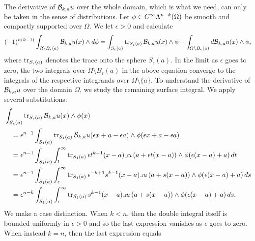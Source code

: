\documentclass[10pt,a4paper]{article}
\begin{document}
The derivative of ${\mathcal B}_{k,a} u$ over the whole domain, which is what we need, can only be taken in the sense of distributions. 
Let $\phi \in C^{\infty}\Lambda^{n-k}(\Omega)$ be smooth and compactly supported over $\Omega$. 
We let $\epsilon > 0$ and calculate 
\begin{align*}
    (-1)^{n(k-1)} %
    \int_{ \Omega \setminus B_\epsilon(a) }
    \Bogov_{\mia,a} u(x) \wedge \cartan \phi 
    =
    \int_{ S_\epsilon(a) }
    \trace_{S_\epsilon(a)}{ \Bogov_{\mia,a} u(x) \wedge \phi } 
    -
    \int_{ \Omega \setminus B_\epsilon(a) }
    \cartan \Bogov_{\mia,a} u(x) \wedge \phi 
    ,
\end{align*}
where $\operatorname{tr}_{S_{\epsilon}(a)}$ denotes the trace onto the sphere $S_{\epsilon}(a)$. 
In the limit as $\epsilon$ goes to zero, the two integrals over $\Omega \setminus B_\epsilon(a)$ in the above equation converge to the integrals of the respective integrands over $\Omega \setminus \{a\}$. 
To understand the derivative of ${\mathcal B}_{k,a} u$ over the domain $\Omega$, 
we study the remaining surface integral. 
We apply several substitutions:
\begin{align*}
    &\int_{ S_\epsilon(a) }
    \operatorname{tr}_{S_\epsilon(a)}{ {\mathcal B}_{k,a} u(x) \wedge \phi(x) } 
    \\&\quad 
    =
    \epsilon^{n-1}
    \int_{ S_1(a) }
    \operatorname{tr}_{S_1(a)}{ {\mathcal B}_{k,a} u( \epsilon x + a - \epsilon a ) \wedge \phi( \epsilon x + a - \epsilon a ) }
    \\&\quad 
    =
    \epsilon^{n-1}
    \int_{ S_1(a) }
    \int_{1}^\infty 
    \operatorname{tr}_{S_1(a)}{ 
        \epsilon t^{k-1} (x-a)\lrcorner u\left( a + \epsilon t( x - a )\right) 
        \wedge \phi( \epsilon (x-a) + a ) 
    }
    \,dt 
    \\&\quad 
    =
    \epsilon^{n-1}
    \int_{ S_1(a) }
    \int_{\epsilon}^\infty 
    \operatorname{tr}_{S_1(a)}{ 
        \epsilon^{-k+1} s^{k-1} (x-a)\lrcorner u\left( a + s( x - a )\right) 
        \wedge \phi( \epsilon (x-a) + a ) 
    }
    \,ds 
    \\&\quad 
    =
    \epsilon^{n-k}
    \int_{ S_1(a) }
    \int_{\epsilon}^\infty 
    \operatorname{tr}_{S_1(a)}{ 
        s^{k-1} (x-a)\lrcorner u\left( a + s( x - a )\right) 
        \wedge \phi( \epsilon (x-a) + a ) 
    }
    \,ds 
    .
\end{align*}
We make a case distinction. When $k<n$, then the double integral itself is bounded uniformly in $\epsilon > 0$ and so the last expression vanishes as $\epsilon$ goes to zero. When instead $k=n$, then the last expression equals 
\end{document}
